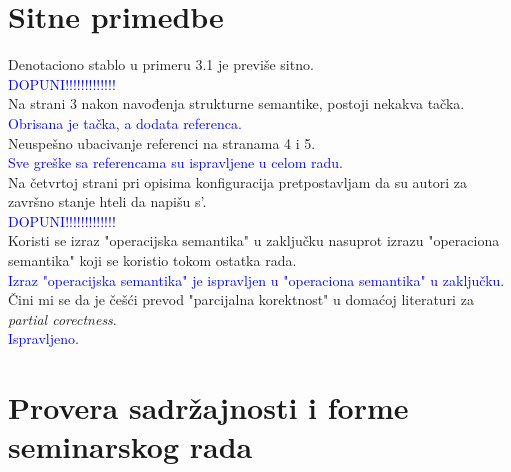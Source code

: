 \documentclass[a4paper]{report}
\newcommand{\odgovor}[1]{\textcolor{blue}{#1}}
\begin{document}
\section{Sitne primedbe}
Denotaciono stablo u primeru 3.1 je previše sitno.\\
\odgovor{DOPUNI!!!!!!!!!!!!!}\\
Na strani 3 nakon navođenja strukturne semantike, postoji nekakva tačka.\\
\odgovor{Obrisana je tačka, a dodata referenca.}\\
Neuspešno ubacivanje referenci na stranama 4 i 5.\\
\odgovor{Sve greške sa referencama su ispravljene u celom radu.}\\
Na četvrtoj strani pri opisima konfiguracija pretpostavljam da su autori za završno stanje hteli da napišu s'.\\
\odgovor{DOPUNI!!!!!!!!!!!!!}\\
Koristi se izraz "operacijska semantika" u zaključku nasuprot izrazu "operaciona semantika"  koji se koristio tokom ostatka rada. \\
\odgovor{Izraz "operacijska semantika" je ispravljen u "operaciona semantika" u zaključku.}\\
Čini mi se da je češći prevod "parcijalna korektnost" u domaćoj literaturi za {\em partial corectness}. \\
\odgovor{Ispravljeno.}\\
\section{Provera sadržajnosti i forme seminarskog rada}
\end{document}
